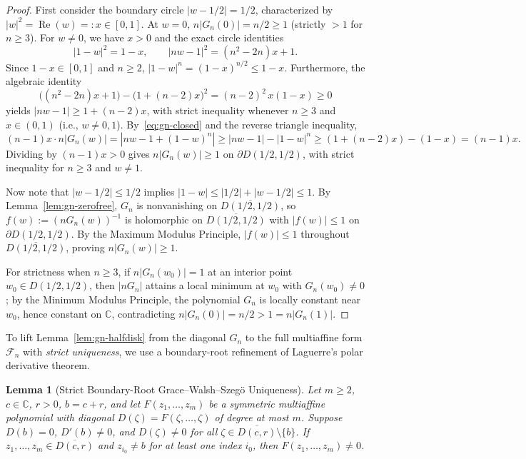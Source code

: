 \documentclass[11pt,a4paper]{article}
\newtheorem{lemma}[theorem]{Lemma}
\theoremstyle{definition}
\theoremstyle{remark}
\newcommand{\CC}{\mathbb{C}}
\DeclareMathOperator{\RePart}{Re}
\begin{document}
\begin{proof}
First consider the boundary circle $|w - 1/2| = 1/2$, characterized by $|w|^2 = \RePart(w) =: x \in [0, 1]$.
At $w = 0$, $n|G_n(0)| = n/2 \ge 1$ (strictly $> 1$ for $n \ge 3$).
For $w \neq 0$, we have $x > 0$ and the exact circle identities
\[
|1 - w|^2 = 1 - x, \qquad |nw - 1|^2 = (n^2 - 2n)x + 1.
\]
Since $1 - x \in [0, 1]$ and $n \ge 2$, $|1 - w|^n = (1 - x)^{n/2} \le 1 - x$. Furthermore, the algebraic identity
\[
\bigl((n^2 - 2n)x + 1\bigr) - \bigl(1 + (n - 2)x\bigr)^2 = (n - 2)^2\, x(1 - x) \ge 0
\]
yields $|nw - 1| \ge 1 + (n - 2)x$, with strict inequality whenever $n \ge 3$ and $x \in (0, 1)$ (i.e., $w \neq 0, 1$). By~\eqref{eq:gn-closed} and the reverse triangle inequality,
\[
(n - 1) x \cdot n|G_n(w)| = |nw - 1 + (1 - w)^n| \ge |nw - 1| - |1 - w|^n \ge (1 + (n - 2)x) - (1 - x) = (n - 1)x.
\]
Dividing by $(n - 1)x > 0$ gives $n|G_n(w)| \ge 1$ on $\partial D(1/2, 1/2)$, with strict inequality for $n \ge 3$ and $w \neq 1$.

Now note that $|w - 1/2| \le 1/2$ implies $|1 - w| \le |1/2| + |w - 1/2| \le 1$. By Lemma~\ref{lem:gn-zerofree}, $G_n$ is nonvanishing on $\overline{D(1/2, 1/2)}$, so $f(w) := (n G_n(w))^{-1}$ is holomorphic on $\overline{D(1/2, 1/2)}$ with $|f(w)| \le 1$ on $\partial D(1/2, 1/2)$. By the Maximum Modulus Principle, $|f(w)| \le 1$ throughout $\overline{D(1/2, 1/2)}$, proving $n|G_n(w)| \ge 1$.

For strictness when $n \ge 3$, if $n|G_n(w_0)| = 1$ at an interior point $w_0 \in D(1/2, 1/2)$, then $|n G_n|$ attains a local minimum at $w_0$ with $G_n(w_0) \neq 0$; by the Minimum Modulus Principle, the polynomial $G_n$ is locally constant near $w_0$, hence constant on $\CC$, contradicting $n|G_n(0)| = n/2 > 1 = n|G_n(1)|$.
\end{proof}

To lift Lemma~\ref{lem:gn-halfdisk} from the diagonal $G_n$ to the full multiaffine form $\mathcal{F}_n$ with \emph{strict uniqueness}, we use a boundary-root refinement of Laguerre's polar derivative theorem.

\begin{lemma}[Strict Boundary-Root Grace--Walsh--Szeg\"o Uniqueness]
\label{lem:gws-unique}
Let $m \ge 2$, $c \in \CC$, $r > 0$, $b = c + r$, and let $F(z_1, \dots, z_m)$ be a symmetric multiaffine polynomial with diagonal $D(\zeta) = F(\zeta, \dots, \zeta)$ of degree at most $m$. Suppose $D(b) = 0$, $D'(b) \neq 0$, and $D(\zeta) \neq 0$ for all $\zeta \in \overline{D(c, r)} \setminus \{b\}$. If $z_1, \dots, z_m \in \overline{D(c, r)}$ and $z_{i_0} \neq b$ for at least one index $i_0$, then $F(z_1, \dots, z_m) \neq 0$.
\end{lemma}
\end{document}
